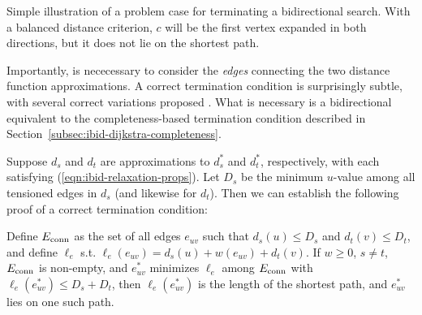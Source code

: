 \begin{marginfigure}
   \centering
   \caption{Simple illustration of a problem case for terminating
      a bidirectional search.
      With a balanced distance criterion,
      $c$ will be the first vertex expanded in both directions,
      but it does not lie on the shortest path.}
   \label{fig:ibid:bidirectional-termination-issue}
\end{marginfigure}

Importantly, is nececessary to consider the \emph{edges} connecting
the two distance function approximations.
A correct termination condition is surprisingly subtle,%
with several correct variations proposed
\citep{nicholson1966shortest, dreyfus1969appraisalsp,
pohl1969bidirectional, goldberg2005spexternalmemory}.
What is necessary is a bidirectional equivalent to the 
completeness-based termination condition
described in Section~\ref{subsec:ibid-dijkstra-completeness}.

Suppose $d_s$ and $d_t$ are approximations to $d^*_s$ and $d_t^*$,
respectively,
with each satisfying (\ref{eqn:ibid-relaxation-props}).
Let $D_s$ be the minimum $u$-value among all tensioned edges in $d_s$
(and likewise for $d_t$).
Then we can establish the following proof of a correct termination
condition:

\begin{theorem}
Define $E_{\mbox{\scriptsize conn}}$ as the set of all edges $e_{uv}$ such that
$d_s(u) \leq D_s$ and $d_t(v) \leq D_t$,
and define $\ell_e$ s.t. $\ell_e(e_{uv}) = d_s(u) + w(e_{uv}) + d_t(v)$.
If $w \geq 0$,
$s \neq t$,
$E_{\mbox{\scriptsize conn}}$ is non-empty,
and $e^*_{uv}$ minimizes $\ell_e$
among $E_{\mbox{\scriptsize conn}}$ with $\ell_e(e^*_{uv}) \leq D_s + D_t$,
then $\ell_e(e^*_{uv})$ is the length of the shortest path,
and $e^*_{uv}$ lies on one such path.
\label{thm:ibid-bidir-sound}
\end{theorem}

